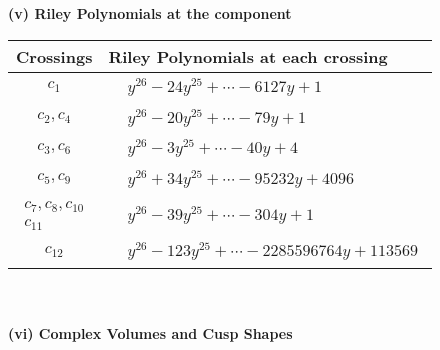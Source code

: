 \documentclass[1p]{elsarticle_modified}
\theoremstyle{definition}
\begin{document}
\newpage\renewcommand{\arraystretch}{1}
\flushleft \textbf{(v) Riley Polynomials at the component}\newline \\
\begin{tabular}{m{50pt}|m{274pt}}
Crossings & \hspace{64pt}Riley Polynomials at each crossing \\
\hline $$\begin{aligned}c_{1}\end{aligned}$$&$\begin{aligned}
&y^{26}-24 y^{25}+\cdots-6127 y+1
\end{aligned}$\\
\hline $$\begin{aligned}c_{2},c_{4}\end{aligned}$$&$\begin{aligned}
&y^{26}-20 y^{25}+\cdots-79 y+1
\end{aligned}$\\
\hline $$\begin{aligned}c_{3},c_{6}\end{aligned}$$&$\begin{aligned}
&y^{26}-3 y^{25}+\cdots-40 y+4
\end{aligned}$\\
\hline $$\begin{aligned}c_{5},c_{9}\end{aligned}$$&$\begin{aligned}
&y^{26}+34 y^{25}+\cdots-95232 y+4096
\end{aligned}$\\
\hline $$\begin{aligned}c_{7},c_{8},c_{10}\\c_{11}\end{aligned}$$&$\begin{aligned}
&y^{26}-39 y^{25}+\cdots-304 y+1
\end{aligned}$\\
\hline $$\begin{aligned}c_{12}\end{aligned}$$&$\begin{aligned}
&y^{26}-123 y^{25}+\cdots-2285596764 y+113569
\end{aligned}$\\
\hline
\end{tabular}\\~\\
\newpage\flushleft \textbf{(vi) Complex Volumes and Cusp Shapes}
\end{document}
